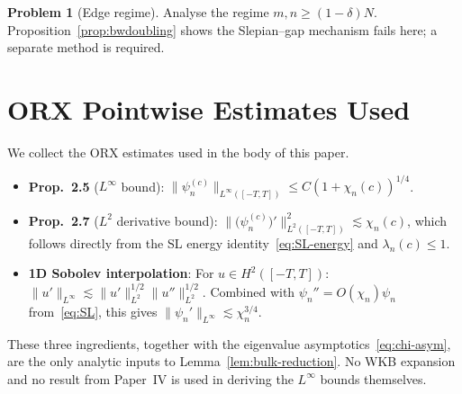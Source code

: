 \documentclass[12pt,a4paper]{amsart}
\theoremstyle{definition}
\newtheorem{problem}{Problem}[section]
\begin{document}
\begin{problem}[Edge regime]\label{prob:edge}
Analyse the regime $m,n \ge (1-\delta)N$.
Proposition~\ref{prop:bwdoubling} shows the Slepian--gap
mechanism fails here; a separate method is required.
\end{problem}

\appendix

\section{ORX Pointwise Estimates Used}\label{app:orx}

We collect the ORX estimates \cite{OsipovRokhlinXiao} used
in the body of this paper.

\begin{itemize}
\item \textbf{Prop.~2.5} ($L^\infty$ bound):
  $\|\psi_n^{(c)}\|_{L^\infty([-T,T])} \le C(1+\chi_n(c))^{1/4}$.
\item \textbf{Prop.~2.7} ($L^2$ derivative bound):
  $\|\bigl(\psi_n^{(c)}\bigr)'\|_{L^2([-T,T])}^2 \lesssim \chi_n(c)$,
  which follows directly from the SL energy identity~\eqref{eq:SL-energy}
  and $\lambda_n(c) \le 1$.
\item \textbf{1D Sobolev interpolation}: For $u \in H^2([-T,T])$:
  $\|u'\|_{L^\infty} \lesssim \|u'\|_{L^2}^{1/2}\|u''\|_{L^2}^{1/2}$.
  Combined with $\psi_n'' = O(\chi_n)\psi_n$ from~\eqref{eq:SL},
  this gives $\|\psi_n'\|_{L^\infty} \lesssim \chi_n^{3/4}$.
\end{itemize}

These three ingredients, together with the eigenvalue
asymptotics~\eqref{eq:chi-asym}, are the only analytic inputs
to Lemma~\ref{lem:bulk-reduction}.
No WKB expansion and no result from Paper~IV is used in
deriving the $L^\infty$ bounds themselves.
\end{document}
